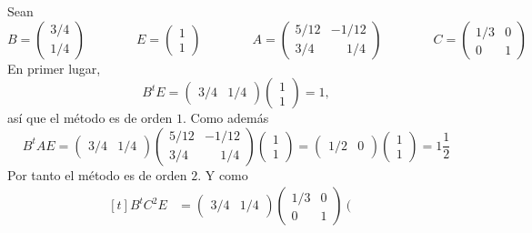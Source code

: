 \documentclass[11pt]{report}
\begin{document}
\begin{enumerate}
Sean
\[B = \left(\begin{array}{c}
    3/4 \\
    1/4
\end{array}\right) \qquad \qquad E = \left(\begin{array}{c}
    1 \\
    1
\end{array}\right) \qquad \qquad A = \left(\begin{array}{cc}
    5/12 & -1/12 \\
    3/4 & \phantom{-}1/4
\end{array}\right) \qquad \qquad C = \left(\begin{array}{cc}
    1/3 & 0 \\
    0 & 1
\end{array}\right) \]
En primer lugar,
\[B^tE = \left(\begin{array}{cc}
    3/4 & 1/4
\end{array}\right)\left(\begin{array}{c}
    1 \\
    1
\end{array}\right) = 1,\]
así que el método es de orden $1$. Como además
\[B^tAE = \left(\begin{array}{cc}
    3/4 & 1/4
\end{array}\right)\left(\begin{array}{cc}
    5/12 & -1/12 \\
    3/4 & \phantom{-}1/4
\end{array}\right)\left(\begin{array}{c}
    1 \\
    1
\end{array}\right) = \left(\begin{array}{cc}
    1/2 & 0
\end{array}\right)\left(\begin{array}{c}
    1 \\
    1
\end{array}\right) = 1\frac{1}{2}\]
Por tanto el método es de orden $2$. Y como
\[\begin{aligned}[t]
    B^tC^2E &= \left(\begin{array}{cc}
        3/4 & 1/4
    \end{array}\right)\left(\begin{array}{cc}
        1/3 & 0 \\
        0 & 1
    \end{array}\right)\left(\begin{array}{cc}

\end{array}
\end{aligned}\]
\end{enumerate}
\end{document}
